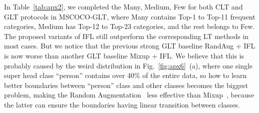 \documentclass{article}
\begin{document}
In Table~\ref{tab:apx2}, we completed the Many, Medium, Few for both CLT and GLT protocols in MSCOCO-GLT, where Many contains Top-1 to Top-11 frequent categories, Medium has Top-12 to Top-23 categories, and the rest belongs to Few. The proposed variants of IFL still outperform the corresponding LT methods in most cases. But we notice that the previous strong GLT baseline RandAug + IFL is now worse than another GLT baseline Mixup + IFL. We believe that this is probably caused by the weird distribution in Fig.~\ref{fig:apx6}~(a), where one single super head class ``person'' contains over 40\% of the entire data, so how to learn better boundaries between ``person'' class and other classes becomes the biggest problem, making the Random Augmentation~\cite{cubuk2020randaugment} less effective than Mixup~\cite{zhang2018mixup}, because the latter can ensure the boundaries having linear transition between classes.

 





\end{document}
